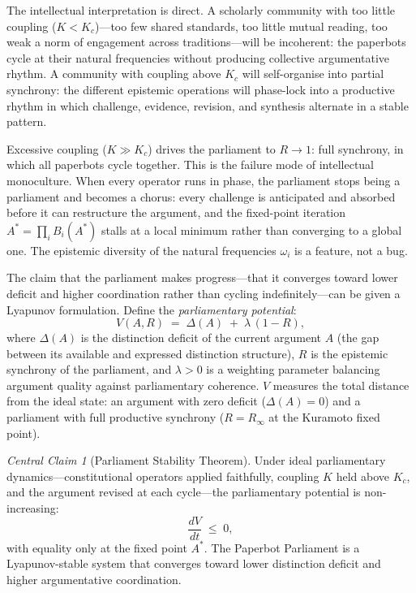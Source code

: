 \documentclass[12pt, letterpaper]{article}
\theoremstyle{remark}
\newtheorem*{claim}{Central Claim}
\begin{document}
The intellectual interpretation is direct.  A scholarly community with too
little coupling ($K < K_c$)---too few shared standards, too little mutual
reading, too weak a norm of engagement across traditions---will be incoherent:
the paperbots cycle at their natural frequencies without producing collective
argumentative rhythm.  A community with coupling above $K_c$ will self-organise
into partial synchrony: the different epistemic operations will phase-lock into
a productive rhythm in which challenge, evidence, revision, and synthesis
alternate in a stable pattern.

Excessive coupling ($K \gg K_c$) drives the parliament to $R \to 1$: full
synchrony, in which all paperbots cycle together.  This is the failure mode
of intellectual monoculture.  When every operator runs in phase, the
parliament stops being a parliament and becomes a chorus: every challenge is
anticipated and absorbed before it can restructure the argument, and the
fixed-point iteration $A^* = \prod_i B_i(A^*)$ stalls at a local minimum
rather than converging to a global one.  The epistemic diversity of the
natural frequencies $\omega_i$ is a feature, not a bug.

The claim that the parliament makes progress---that it converges toward lower
deficit and higher coordination rather than cycling indefinitely---can be
given a Lyapunov formulation.  Define the \emph{parliamentary potential}:
\begin{equation}
  V(A, R) \;=\; \Delta(A) \;+\; \lambda\,(1 - R),
  \label{eq:lyapunov}
\end{equation}
where $\Delta(A)$ is the distinction deficit of the current argument $A$
(the gap between its available and expressed distinction structure), $R$ is
the epistemic synchrony of the parliament, and $\lambda > 0$ is a weighting
parameter balancing argument quality against parliamentary coherence.  $V$
measures the total distance from the ideal state: an argument with zero
deficit ($\Delta(A) = 0$) and a parliament with full productive synchrony
($R = R_\infty$ at the Kuramoto fixed point).

\begin{claim}[Parliament Stability Theorem]
Under ideal parliamentary dynamics---constitutional operators applied
faithfully, coupling $K$ held above $K_c$, and the argument revised at
each cycle---the parliamentary potential is non-increasing:
\[
  \frac{dV}{dt} \;\leq\; 0,
\]
with equality only at the fixed point $A^*$.  The Paperbot Parliament
is a Lyapunov-stable system that converges toward lower distinction deficit
and higher argumentative coordination.
\end{claim}
\end{document}
